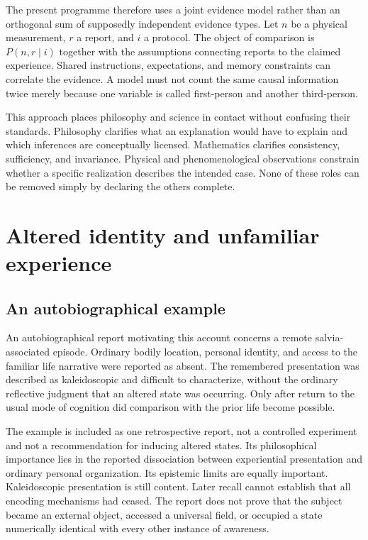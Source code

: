 The present programme therefore uses a joint evidence model rather than an orthogonal sum of supposedly independent evidence types. Let $n$ be a physical measurement, $r$ a report, and $i$ a protocol. The object of comparison is $P(n,r\mid i)$ together with the assumptions connecting reports to the claimed experience. Shared instructions, expectations, and memory constraints can correlate the evidence. A model must not count the same causal information twice merely because one variable is called first-person and another third-person.

This approach places philosophy and science in contact without confusing their standards. Philosophy clarifies what an explanation would have to explain and which inferences are conceptually licensed. Mathematics clarifies consistency, sufficiency, and invariance. Physical and phenomenological observations constrain whether a specific realization describes the intended case. None of these roles can be removed simply by declaring the others complete.

\chapter{Altered identity and unfamiliar experience}\label{ch:altered}
\section{An autobiographical example}\label{section:altered:an-autobiographical-example}
An autobiographical report motivating this account concerns a remote salvia-associated episode. Ordinary bodily location, personal identity, and access to the familiar life narrative were reported as absent. The remembered presentation was described as kaleidoscopic and difficult to characterize, without the ordinary reflective judgment that an altered state was occurring. Only after return to the usual mode of cognition did comparison with the prior life become possible.

The example is included as one retrospective report, not a controlled experiment and not a recommendation for inducing altered states. Its philosophical importance lies in the reported dissociation between experiential presentation and ordinary personal organization. Its epistemic limits are equally important. Kaleidoscopic presentation is still content. Later recall cannot establish that all encoding mechanisms had ceased. The report does not prove that the subject became an external object, accessed a universal field, or occupied a state numerically identical with every other instance of awareness.

